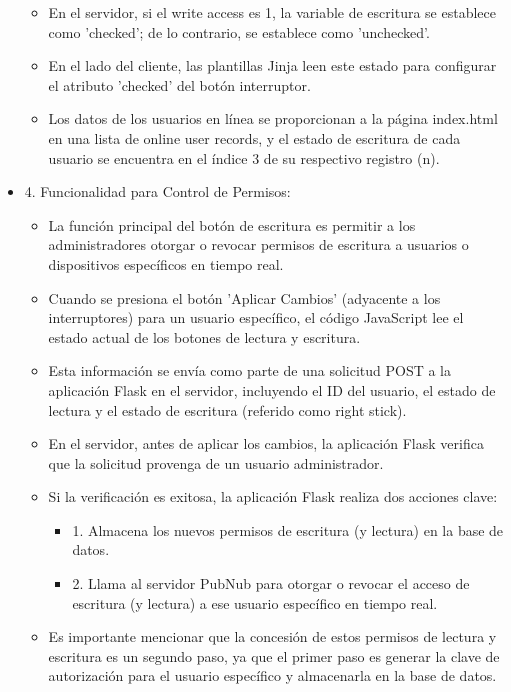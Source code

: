 \documentclass{report}
\begin{document}
\begin{itemize}
\begin{itemize}
            \item En el servidor, si el write access es 1, la variable de escritura se establece como 'checked'; de lo contrario, se establece 
            como 'unchecked'.
            \item En el lado del cliente, las plantillas Jinja leen este estado para configurar el atributo 'checked' del botón interruptor.
            \item Los datos de los usuarios en línea se proporcionan a la página index.html en una lista de online user records, y el estado 
            de escritura de cada usuario se encuentra en el índice 3 de su respectivo registro (n).        
        \end{itemize}
    \item 4. Funcionalidad para Control de Permisos:
        \begin{itemize}
            \item La función principal del botón de escritura es permitir a los administradores otorgar o revocar permisos de escritura a 
            usuarios o dispositivos específicos en tiempo real.
            \item Cuando se presiona el botón 'Aplicar Cambios' (adyacente a los interruptores) para un usuario específico, el código 
            JavaScript lee el estado actual de los botones de lectura y escritura.
            \item Esta información se envía como parte de una solicitud POST a la aplicación Flask en el servidor, incluyendo el ID del 
            usuario, el estado de lectura y el estado de escritura (referido como right stick).
            \item En el servidor, antes de aplicar los cambios, la aplicación Flask verifica que la solicitud provenga de un usuario administrador.
            \item Si la verificación es exitosa, la aplicación Flask realiza dos acciones clave:
                \begin{itemize}
                    \item 1. Almacena los nuevos permisos de escritura (y lectura) en la base de datos.
                    \item 2. Llama al servidor PubNub para otorgar o revocar el acceso de escritura (y lectura) a ese usuario específico en 
                    tiempo real.
                \end{itemize}
            \item Es importante mencionar que la concesión de estos permisos de lectura y escritura es un segundo paso, ya que el primer 
            paso es generar la clave de autorización para el usuario específico y almacenarla en la base de datos.        
        \end{itemize}
\end{itemize}
\end{document}
